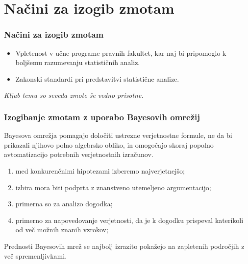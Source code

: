 \documentclass{beamer}
\begin{document}
\section{Načini za izogib zmotam}

\begin{frame}
    \frametitle{Načini za izogib zmotam}
    \begin{itemize}
        \item Vpletenost v učne programe pravnih fakultet, kar naj bi pripomoglo k boljšemu razumevanju statističnih analiz.
        \item Zakonski standardi pri predstavitvi statistične analize.
    \end{itemize} \vspace{3mm}
    \begin{block}{}
        \centering
        \textit{Kljub temu so seveda zmote še vedno prisotne.}
    \end{block}
\end{frame}

\begin{frame}
    \frametitle{Izogibanje zmotam z uporabo Bayesovih omrežij}
    \begin{block}{}
        Bayesova omrežja pomagajo določiti ustrezne verjetnostne formule, ne da bi prikazali njihovo polno algebrsko obliko, in omogočajo skoraj popolno avtomatizacijo potrebnih verjetnostnih izračunov.
    \end{block} \vspace{3mm}
    \begin{enumerate}
        \item med konkurenčnimi hipotezami izberemo najverjetnejšo;
        \item izbira mora biti podprta z znanstveno utemeljeno argumentacijo;
        \item primerna so za analizo dogodka;
        \item primerno za napovedovanje verjetnosti, da je k dogodku prispeval katerikoli od več možnih znanih vzrokov;
    \end{enumerate}
    \begin{block}{}
        Prednosti Bayesovih mrež se najbolj izrazito pokažejo na zapletenih področjih z več spremenljivkami.
    \end{block}
\end{frame}
\end{document}
